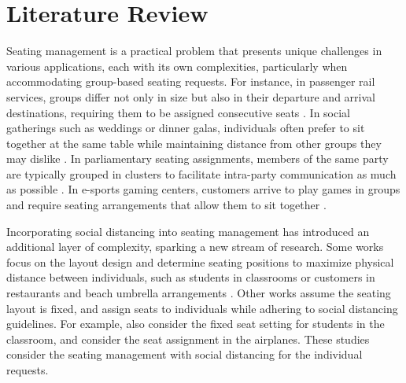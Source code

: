 \section{Literature Review}\label{literature}


Seating management is a practical problem that presents unique challenges in various applications, each with its own complexities, particularly when accommodating group-based seating requests. For instance, in passenger rail services, groups differ not only in size but also in their departure and arrival destinations, requiring them to be assigned consecutive seats \citep{clausen2010off, deplano2019offline}. In social gatherings such as weddings or dinner galas, individuals often prefer to sit together at the same table while maintaining distance from other groups they may dislike \citep{lewis2016creating}. In parliamentary seating assignments, members of the same party are typically grouped in clusters to facilitate intra-party communication as much as possible \citep{vangerven2022parliament}. In e-sports gaming centers, customers arrive to play games in groups and require seating arrangements that allow them to sit together \citep{kwag2022optimal}.

Incorporating social distancing into seating management has introduced an additional layer of complexity, sparking a new stream of research. Some works focus on the layout design and determine seating positions to maximize physical distance between individuals, such as students in classrooms \citep{bortolete2022support} or customers in restaurants and beach umbrella arrangements \citep{fischetti2023safe}. Other works assume the seating layout is fixed, and assign seats to individuals while adhering to social distancing guidelines. For example, \citet{bortolete2022support} also consider the fixed seat setting for students in the classroom, \citet{salari2020social} and \citet{pavlik2021airplane} consider the seat assignment in the airplanes. These studies consider the seating management with social distancing for the individual requests.


